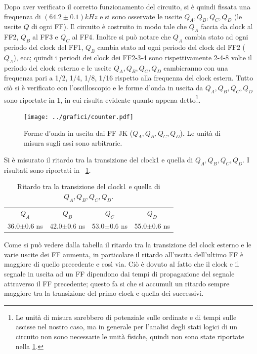 \documentclass[a4paper,10pt]{article}
\begin{document}
Dopo aver verificato il corretto funzionamento del circuito, si è quindi fissata una frequenza di $(64.2 \pm 0.1)kHz$ e si sono osservate le uscite $Q_A,Q_B,Q_C,Q_D$ (le uscite $Q$ di ogni FF). Il circuito è costruito in modo tale che $Q_A$ faccia da clock al FF2, $Q_B$ al FF3 e $Q_C$ al FF4. Inoltre si può notare che $Q_A$ cambia stato ad ogni periodo del clock del FF1, $Q_B$ cambia stato ad ogni periodo del clock del FF2 ($Q_A$), ecc; quindi i periodi dei clock dei FF2-3-4 sono rispettivamente 2-4-8 volte il periodo del clock esterno e le uscite $Q_A,Q_B,Q_C,Q_D$ cambieranno con una frequenza pari a 1/2, 1/4, 1/8, 1/16 rispetto alla frequenza del clock estern. Tutto ciò si è verificato con l'oscilloscopio e le forme d'onda in uscita da $Q_A,Q_B,Q_C,Q_D$ sono riportate in \cref{fig:divisor}, in cui risulta evidente quanto appena detto\footnote{Le unità di misura sarebbero di potenziale sulle ordinate e di tempi sulle ascisse nel nostro caso, ma in generale per l'analisi degli stati logici di un circuito non sono necessarie le unità fisiche, quindi non sono state riportate nella \cref{fig:divisor}.}.


\begin{figure}[H]
	\centering
	\texttt{[image: ../grafici/counter.pdf]}
	\caption{Forme d'onda in uscita dai FF JK ($Q_A,Q_B,Q_C,Q_D$). Le unità di misura sugli assi sono arbitrarie.}
	\label{fig:divisor}
\end{figure}



Si è misurato il ritardo tra la transizione del clock1 e quella di $Q_A,Q_B,Q_C,Q_D$. I risultati sono riportati in \tablename{~\ref{tab:time}}.

\begin{table}[H]
	\centering
	\begin{tabular}{cccc}
\hline
$Q_A$ & $Q_B$ & $Q_C$ & $Q_D$ \\
36.0$\pm$0.6 ns & 42.0$\pm$0.6 ns & 53.0$\pm$0.6 ns & 55.0$\pm$0.6 ns \\
\hline
	\end{tabular}
	\caption{Ritardo tra la transizione del clock1 e quella di $Q_A,Q_B,Q_C,Q_D$.}
	\label{tab:time}
\end{table}

Come si può vedere dalla tabella il ritardo tra la transizione del clock esterno e le varie uscite dei FF aumenta, in particolare il ritardo all'uscita dell'ultimo FF è maggiore di quello precedente e così via. Ciò è dovuto al fatto che il clock e il segnale in uscita ad un FF dipendono dai tempi di propagazione del segnale attraverso il FF precedente; questo fa si che si accumuli un ritardo sempre maggiore tra la transizione del primo clock e quella dei successivi.
\end{document}
